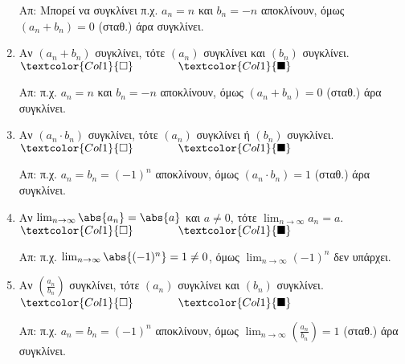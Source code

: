 \begin{enumerate}[itemsep=.5\baselineskip]
    Απ: Μπορεί να συγκλίνει π.χ. $ a_{n}= n $ και $ b_{n}=-n $ αποκλίνουν, 
    όμως $ (a_{n}+b_{n})=0 $ (σταθ.) άρα συγκλίνει.

  \item \textcolor{Col1}{Αν $ (a_{n}+b_{n}) $ συγκλίνει, τότε $ (a_{n}) 
    $ συγκλίνει και $ (b_{n}) $ συγκλίνει}.
    \hfill $\textcolor{Col1}{\square} \qquad \qquad \textcolor{Col1}{\blacksquare}$

    Απ: π.χ. $ a_{n}= n $ και $ b_{n}=-n $ αποκλίνουν, όμως $ (a_{n}+b_{n})=0 $ 
    (σταθ.) άρα συγκλίνει.

  \item \textcolor{Col1}{Αν $ (a_{n}\cdot b_{n}) $ συγκλίνει, τότε $ (a_{n}) $ 
      συγκλίνει ή $ (b_{n}) $ συγκλίνει}.
    \hfill $\textcolor{Col1}{\square} \qquad \qquad \textcolor{Col1}{\blacksquare}$

    Απ: π.χ. $ a_{n}=b_{n}=(-1)^{n} $ αποκλίνουν, όμως $ (a_{n}\cdot
    b_{n})=1 $ (σταθ.) άρα συγκλίνει. 

  \item \textcolor{Col1}{Αν $ \lim_{n \to \infty} \abs{a_{n}} = \abs{a} $ και 
      $ a \neq 0 $, τότε $ \lim_{n \to \infty} a_{n} = a $}.
    \hfill $\textcolor{Col1}{\square} \qquad \qquad \textcolor{Col1}{\blacksquare}$

    Απ: π.χ. $ \lim_{n \to \infty} \abs{(-1)^{n}} = 1 \neq 0 $, όμως 
    $ \lim_{n \to \infty} (-1)^{n} $ δεν υπάρχει.

  \item \textcolor{Col1}{Αν $ \left(\frac{a_{n}}{b_{n}}\right) $ συγκλίνει, τότε 
      $ (a_{n}) $ συγκλίνει και $ (b_{n}) $ συγκλίνει}.
    \hfill $\textcolor{Col1}{\square} \qquad \qquad \textcolor{Col1}{\blacksquare}$

    Απ: π.χ. $ a_{n}=b_{n}=(-1)^{n} $ αποκλίνουν, όμως $ \lim_{n
    \to \infty} (\frac{a_{n}}{b_{n}})=1 $ (σταθ.) άρα συγκλίνει. 
\end{enumerate}




